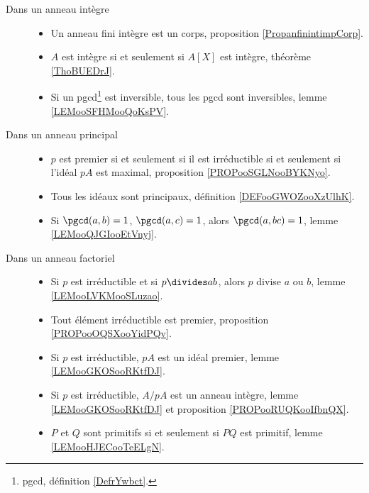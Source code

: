 \begin{description}
	\item[Dans un anneau intègre]\hspace{1cm}
	      \begin{itemize}
		      \item
		            Un anneau fini intègre est un corps, proposition \ref{PropanfinintimpCorp}.
		      \item
		            \( A\) est intègre si et seulement si \( A[X]\) est intègre, théorème \ref{ThoBUEDrJ}.
		      \item
		            Si un pgcd\footnote{pgcd, définition \ref{DefrYwbct}.} est inversible, tous les pgcd sont inversibles, lemme \ref{LEMooSFHMooQoKsPV}.
	      \end{itemize}
	\item[Dans un anneau principal]\hspace{1cm}
	      \begin{itemize}
		      \item
		            \( p\) est premier si et seulement si il est irréductible si et seulement si l'idéal \( pA\) est maximal, proposition \ref{PROPooSGLNooBYKNyo}.
		      \item
		            Tous les idéaux sont principaux, définition \ref{DEFooGWOZooXzUlhK}.
		      \item
		            Si \( \pgcd(a,b)=1\), \( \pgcd(a,c)=1\), alors \( \pgcd(a,bc)=1\), lemme \ref{LEMooQJGIooEtVnyj}.
	      \end{itemize}
	\item[Dans un anneau factoriel]\hspace{1cm}
	      \begin{itemize}
		      \item
		            Si \( p\) est irréductible et si \( p\divides ab\), alors \( p\) divise \( a\) ou \( b\), lemme \ref{LEMooLVKMooSLuzao}.
		      \item
		            Tout élément irréductible est premier, proposition \ref{PROPooOQSXooYidPQv}.
		      \item
		            Si \( p\) est irréductible, \( pA\) est un idéal premier, lemme \ref{LEMooGKOSooRKtfDJ}.
		      \item
		            Si \( p\) est irréductible, \( A/pA\) est un anneau intègre, lemme \ref{LEMooGKOSooRKtfDJ} et proposition \ref{PROPooRUQKooIfbnQX}.
		      \item
		            \( P\) et \( Q\) sont primitifs si et seulement si \( PQ\) est primitif, lemme \ref{LEMooHJECooTeELgN}.

\end{itemize}
\end{description}
